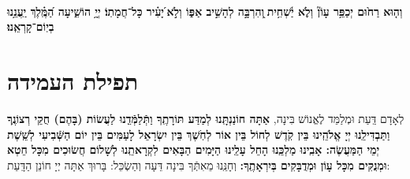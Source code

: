 \documentclass[twoside, openany, parskip=half, 11pt]{book}
\begin{document}
\\
\textbf{וְה֤וּא רַח֙וּם יְכַפֵּ֥ר עָוֹן֘ וְלֹ֢א יַ֫שְׁחִ֥ית ֖וְהִרְבָּ֣ה לְהָשִׁ֣יב אַפּ֑וֹ וְלֹ֣א ֝יָעִ֗יר כָּל־חֲמָתֽוֹ׃ יְיָ֥ הוֹשִׁ֑יעָה הַ֝מֶּֽ֗לֶךְ יַֽעֲנֵ֥נוּ בְיֽוֹם־קָרְאֵֽנוּ׃}

\clearpage

\barachu

\hamaarivaravim

\ahavasolam

\shema

\veahavta

\vehaya

\vayomer{}

\emesveemuna 

\hashkiveinu 

\boruchhashemleolam 

\yerueinnu

\halfkaddish

 \section*{ תפילת העמידה }
 
\amidaopening{\ayt}{}

\weekdaysakiddushhashem

 לְאָדָם דַּֽעַת וּמְלַמֵּד לֶאֱנוֹשׁ בִּינָה,
 \textbf{
 אַתָּה חוֹנַנְתָּֽנוּ לְמַדַּע תּוֹרָתֶֽךָ וַתְּֿלַמְּֿדֵֽנוּ לַעֲשׂוֹת (בָּהֶם) חֻקֵּי רְצוֹנֶֽךָ וַתַּבְדִּילֵֽנוּ יְיָ אֱלֹהֵֽינוּ בֵּין קֹֽדֶשׁ לְחוֹל בֵּין אוֹר לְחֹֽשֶׁךְ בֵּין יִשְׂרָאֵל לָעַמִּים בֵּין יוֹם הַשְּֿׁבִיעִי לְשֵֽׁשֶׁת יְמֵי הַמַּעֲשֶׂה: אָבִֽינוּ מַלְכֵּֽנוּ הָחֵל עָלֵֽינוּ הַיָּמִים הַבָּאִים לִקְרָאתֵֽנוּ לְשָׁלוֹם חֲשׂוּכִים מִכָּל חֵטְא וּמְנֻקִּים מִכָּל עָוֹן וּמְדֻבָּקִים בְּיִרְאָתֶֽךָ:
}
 וְחָנֵּֽנוּ מֵאִתְּֿךָ בִּינָה דֵּעָה וְהַשְׂכֵּל: בָּרוּךְ אַתָּה יְיָ חוֹנֵן הַדָּֽעַת:

\weekdaysateshuva

\weekdaysaselichah

\weekdaysageulah

\weekdaysarefuah

\weekdaysaberacha

\weekdaysashofar

\weekdaysamishpat

\weekdaysaminim

\weekdaysatzadikim

\weekdaysayerushelayim

\weekdaysamalchus

\weekdaysashemakoleinu
\end{document}
